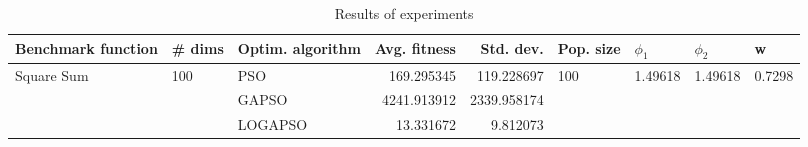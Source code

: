 \begin{table}
\centering
\caption{Results of experiments}
\begin{tabular}{lllrrllll}
\toprule
         Benchmark function &              \# dims & Optim. algorithm &  Avg. fitness &   Std. dev. &            Pop. size &               $\phi_{1}$ &               $\phi_{2}$ &                       w \\
\midrule
\multirow{3}{*}{Square Sum} & \multirow{3}{*}{100} &              PSO &    169.295345 &  119.228697 & \multirow{3}{*}{100} & \multirow{3}{*}{1.49618} & \multirow{3}{*}{1.49618} & \multirow{3}{*}{0.7298} \\
                            &                      &            GAPSO &   4241.913912 & 2339.958174 &                      &                          &                          &                         \\
                            &                      &          LOGAPSO &     13.331672 &    9.812073 &                      &                          &                          &                         \\
\bottomrule
\end{tabular}
\end{table}
